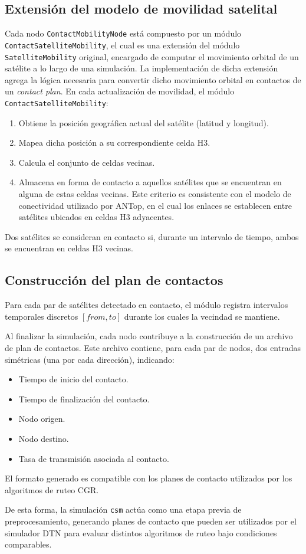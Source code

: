 \subsection{Extensión del modelo de movilidad satelital}

Cada nodo \texttt{ContactMobilityNode} está compuesto por un módulo \texttt{ContactSatelliteMobility}, el cual es una extensión del módulo \texttt{SatelliteMobility} original, encargado de computar el movimiento orbital de un satélite a lo largo de una simulación. La implementación de dicha extensión agrega la lógica necesaria para convertir dicho movimiento orbital en contactos de un \emph{contact plan}. En cada actualización de movilidad, el módulo \texttt{ContactSatelliteMobility}:

\begin{enumerate}
    \item Obtiene la posición geográfica actual del satélite (latitud y longitud).
    \item Mapea dicha posición a su correspondiente celda H3.
    \item Calcula el conjunto de celdas vecinas.
    \item Almacena en forma de contacto a aquellos satélites que se encuentran en alguna de estas celdas vecinas. Este criterio es consistente con el modelo de conectividad utilizado por ANTop, en el cual los enlaces se establecen entre satélites ubicados en celdas H3 adyacentes.
\end{enumerate}

Dos satélites se consideran en contacto si, durante un intervalo de tiempo, ambos se encuentran en celdas H3 vecinas.

\subsection{Construcción del plan de contactos}

Para cada par de satélites detectado en contacto, el módulo registra intervalos temporales discretos \([\textit{from}, \textit{to}]\) durante los cuales la vecindad se mantiene.

Al finalizar la simulación, cada nodo contribuye a la construcción de un archivo de plan de contactos. Este archivo contiene, para cada par de nodos, dos entradas simétricas (una por cada dirección), indicando:
\begin{itemize}
    \item Tiempo de inicio del contacto.
    \item Tiempo de finalización del contacto.
    \item Nodo origen.
    \item Nodo destino.
    \item Tasa de transmisión asociada al contacto.
\end{itemize}

El formato generado es compatible con los planes de contacto utilizados por los algoritmos de ruteo CGR.

De esta forma, la simulación \texttt{csm} actúa como una etapa previa de preprocesamiento, generando planes de contacto que pueden ser utilizados por el simulador DTN para evaluar distintos algoritmos de ruteo bajo condiciones comparables.

